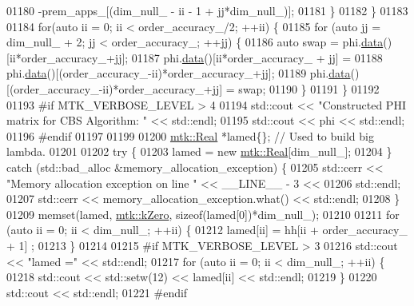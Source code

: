 \begin{DoxyCode}
{{01180           -prem\_apps\_[(dim\_null\_ - ii - 1 + jj*dim\_null\_)];
01181       \}
01182     \}
01183 
01184     \textcolor{keywordflow}{for}(\textcolor{keyword}{auto} ii = 0; ii < order\_accuracy\_/2; ++ii) \{
01185       \textcolor{keywordflow}{for} (\textcolor{keyword}{auto} jj = dim\_null\_ + 2; jj < order\_accuracy\_; ++jj) \{
01186         \textcolor{keyword}{auto} swap = phi.\hyperlink{classmtk_1_1DenseMatrix_a0c33b8a9e01d157c61ddbdf807c25d84}{data}()[ii*order\_accuracy\_+jj];
01187         phi.\hyperlink{classmtk_1_1DenseMatrix_a0c33b8a9e01d157c61ddbdf807c25d84}{data}()[ii*order\_accuracy\_ + jj] =
01188           phi.\hyperlink{classmtk_1_1DenseMatrix_a0c33b8a9e01d157c61ddbdf807c25d84}{data}()[(order\_accuracy\_-ii)*order\_accuracy\_+jj];
01189         phi.\hyperlink{classmtk_1_1DenseMatrix_a0c33b8a9e01d157c61ddbdf807c25d84}{data}()[(order\_accuracy\_-ii)*order\_accuracy\_+jj] = swap;
01190       \}
01191     \}
01192 
01193 \textcolor{preprocessor}{    #if MTK\_VERBOSE\_LEVEL > 4}
01194     std::cout << \textcolor{stringliteral}{"Constructed PHI matrix for CBS Algorithm: "} << std::endl;
01195     std::cout << phi << std::endl;
01196 \textcolor{preprocessor}{    #endif}
01197 
01199 
01200     \hyperlink{group__c01-roots_gac080bbbf5cbb5502c9f00405f894857d}{mtk::Real} *lamed\{\};  \textcolor{comment}{// Used to build big lambda.}
01201 
01202     \textcolor{keywordflow}{try} \{
01203       lamed = \textcolor{keyword}{new} \hyperlink{group__c01-roots_gac080bbbf5cbb5502c9f00405f894857d}{mtk::Real}[dim\_null\_];
01204     \} \textcolor{keywordflow}{catch} (std::bad\_alloc &memory\_allocation\_exception) \{
01205       std::cerr << \textcolor{stringliteral}{"Memory allocation exception on line "} << \_\_LINE\_\_ - 3 <<
01206         std::endl;
01207       std::cerr << memory\_allocation\_exception.what() << std::endl;
01208     \}
01209     memset(lamed, \hyperlink{group__c01-roots_ga59a451a5fae30d59649bcda274fea271}{mtk::kZero}, \textcolor{keyword}{sizeof}(lamed[0])*dim\_null\_);
01210 
01211     \textcolor{keywordflow}{for} (\textcolor{keyword}{auto} ii = 0; ii < dim\_null\_; ++ii) \{
01212       lamed[ii] = hh[ii + order\_accuracy\_ + 1] ;
01213     \}
01214 
01215 \textcolor{preprocessor}{    #if MTK\_VERBOSE\_LEVEL > 3}
01216     std::cout << \textcolor{stringliteral}{"lamed ="} << std::endl;
01217     \textcolor{keywordflow}{for} (\textcolor{keyword}{auto} ii = 0; ii < dim\_null\_; ++ii) \{
01218       std::cout << std::setw(12) << lamed[ii] << std::endl;
01219     \}
01220     std::cout << std::endl;
01221 \textcolor{preprocessor}{    #endif}
}}
\end{DoxyCode}
